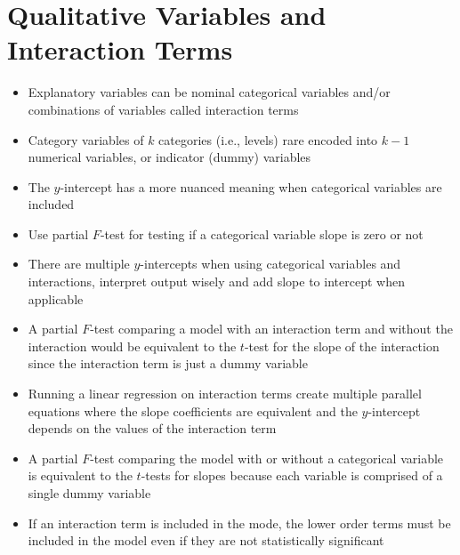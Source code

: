 \documentclass[12pt]{article}
\begin{document}
\section{Qualitative Variables and Interaction Terms}
\begin{itemize}
\item Explanatory variables can be nominal categorical variables and/or combinations of variables called interaction terms 
\item Category variables of $k$ categories (i.e., levels) rare encoded into $k-1$ numerical variables, or indicator (dummy) variables 
\item The $y$-intercept has a more nuanced meaning when categorical variables are included 
\item Use partial $F$-test for testing if a categorical variable slope is zero or not 
\item There are multiple $y$-intercepts when using categorical variables and interactions, interpret output wisely and add slope to intercept when applicable 
\item A partial $F$-test comparing a model with an interaction term and without the interaction would be equivalent to the $t$-test for the slope of the interaction since the interaction term is just a dummy variable 
\item Running a linear regression on interaction terms create multiple parallel equations where the slope coefficients are equivalent and the $y$-intercept depends on the values of the interaction term 
\item A partial $F$-test comparing the model with or without a categorical variable is equivalent to the $t$-tests for slopes because each variable is comprised of a single dummy variable 
\item If an interaction term is included in the mode, the lower order terms must be included in the model even if they are not statistically significant 
\end{itemize}
\end{document}
